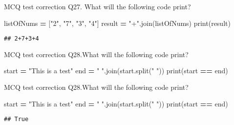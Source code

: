 \documentclass[
  8pt,
  ignorenonframetext,
]{beamer}
\newenvironment{Shaded}{\begin{snugshade}}{\end{snugshade}}
\newcommand{\BuiltInTok}[1]{#1}
\newcommand{\NormalTok}[1]{#1}
\newcommand{\OperatorTok}[1]{\textcolor[rgb]{0.81,0.36,0.00}{\textbf{#1}}}
\newcommand{\StringTok}[1]{\textcolor[rgb]{0.31,0.60,0.02}{#1}}
\begin{document}
\begin{frame}[fragile]{MCQ test correction}
\protect\hypertarget{mcq-test-correction-53}{}
Q27. What will the following code print?

\begin{Shaded}
\begin{Highlighting}[]
\NormalTok{listOfNums }\OperatorTok{=}\NormalTok{ [}\StringTok{"2"}\NormalTok{, }\StringTok{"7"}\NormalTok{, }\StringTok{"3"}\NormalTok{, }\StringTok{"4"}\NormalTok{]}
\NormalTok{result }\OperatorTok{=} \StringTok{"+"}\NormalTok{.join(listOfNums)}
\BuiltInTok{print}\NormalTok{(result)}
\end{Highlighting}
\end{Shaded}

\begin{verbatim}
## 2+7+3+4
\end{verbatim}
\end{frame}

\begin{frame}[fragile]{MCQ test correction}
\protect\hypertarget{mcq-test-correction-54}{}
Q28.What will the following code print?

\begin{Shaded}
\begin{Highlighting}[]
\NormalTok{start }\OperatorTok{=} \StringTok{"This is a test"}
\NormalTok{end }\OperatorTok{=} \StringTok{" "}\NormalTok{.join(start.split(}\StringTok{" "}\NormalTok{))}
\BuiltInTok{print}\NormalTok{(start }\OperatorTok{==}\NormalTok{ end)}
\end{Highlighting}
\end{Shaded}
\end{frame}

\begin{frame}[fragile]{MCQ test correction}
\protect\hypertarget{mcq-test-correction-55}{}
Q28.What will the following code print?

\begin{Shaded}
\begin{Highlighting}[]
\NormalTok{start }\OperatorTok{=} \StringTok{"This is a test"}
\NormalTok{end }\OperatorTok{=} \StringTok{" "}\NormalTok{.join(start.split(}\StringTok{" "}\NormalTok{))}
\BuiltInTok{print}\NormalTok{(start }\OperatorTok{==}\NormalTok{ end)}
\end{Highlighting}
\end{Shaded}

\begin{verbatim}
## True
\end{verbatim}
\end{frame}
\end{document}
